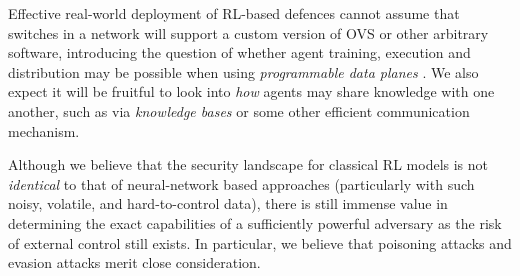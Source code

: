 \documentclass[conference, letterpaper, 10pt, times]{IEEEtran}
\begin{document}
Effective real-world deployment of RL-based defences cannot assume that switches in a network will support a custom version of OVS or other arbitrary software, introducing the question of whether agent training, execution and distribution may be possible when using \emph{programmable data planes} \cite{DBLP:conf/ancs/JouetP17}.
We also expect it will be fruitful to look into \emph{how} agents may share knowledge with one another, such as via \emph{knowledge bases} or some other efficient communication mechanism.

Although we believe that the security landscape for classical RL models is not \emph{identical} to that of neural-network based approaches (particularly with such noisy, volatile, and hard-to-control data), there is still immense value in determining the exact capabilities of a sufficiently powerful adversary as the risk of external control still exists.
In particular, we believe that poisoning attacks and evasion attacks merit close consideration.
\end{document}
